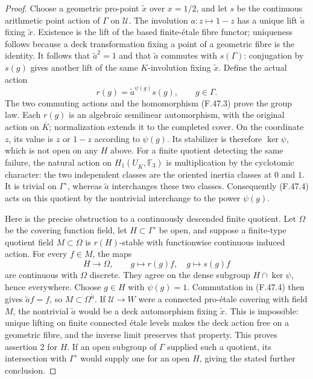 \documentclass[11pt,oneside]{article}
\begin{document}
\begin{proof}
Choose a geometric pro-point $\widetilde x$ over
$x=1/2$, and let $s$ be the continuous arithmetic point
action of $\Gamma$ on $\mathcal U$. The involution
$a:z\mapsto1-z$ has a unique lift $\widetilde a$ fixing
$\widetilde x$. Existence is the lift of the based
finite-\'etale fibre functor; uniqueness follows because
a deck transformation fixing a point of a geometric
fibre is the identity. It follows that
$\widetilde a^2=1$ and that $\widetilde a$ commutes with
$s(\Gamma)$: conjugation by $s(g)$ gives another lift
of the same $K$-involution fixing $\widetilde x$.
Define the actual action
\[
 r(g)=\widetilde a^{\psi(g)}s(g),\qquad g\in\Gamma.
 \tag{F.47.4}
\]
The two commuting actions and the homomorphism (F.47.3)
prove the group law. Each $r(g)$ is an algebraic
semilinear automorphism, with the original action on
$\overline K$; normalization extends it to the completed
cover. On the coordinate $z$, its value is $z$ or
$1-z$ according to $\psi(g)$. Its stabilizer is therefore
$\ker\psi$, which is not open on any $H$ above.
For a finite quotient detecting the same failure, the
natural action on
$H_1(U_{\overline K},\mathbb F_3)$ is multiplication by
the cyclotomic character: the two independent classes
are the oriented inertia classes at $0$ and $1$.
It is trivial on $\Gamma^\circ$, whereas
$\widetilde a$ interchanges these two classes.
Consequently (F.47.4) acts on this quotient by the
nontrivial interchange to the power $\psi(g)$.

Here is the precise obstruction to a continuously
descended finite quotient. Let $\Omega$ be the covering
function field, let $H\subset\Gamma^\circ$ be open,
and suppose a finite-type quotient field
$M\subset\Omega$ is $r(H)$-stable with functionwise
continuous induced action. For every $f\in M$, the maps
\[
 H\longrightarrow\Omega,\qquad
 g\longmapsto r(g)f,\quad g\longmapsto s(g)f
\]
are continuous with $\Omega$ discrete. They agree on
the dense subgroup $H\cap\ker\psi$, hence everywhere.
Choose $g\in H$ with $\psi(g)=1$. Commutation in
(F.47.4) then gives $\widetilde a f=f$, so
$M\subset\Omega^{\widetilde a}$. If
$\mathcal U\to W$ were a connected pro-\'etale covering
with field $M$, the nontrivial $\widetilde a$ would be
a deck automorphism fixing $\widetilde x$. This is
impossible: unique lifting on finite connected
\'etale levels makes the deck action free on a geometric
fibre, and the inverse limit preserves that property.
This proves assertion 2 for $H$. If an open subgroup
of $\Gamma$ supplied such a quotient, its intersection
with $\Gamma^\circ$ would supply one for an open $H$,
giving the stated further conclusion.


\end{proof}
\end{document}
